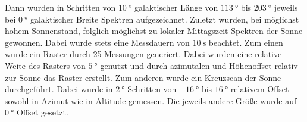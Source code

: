 Dann wurden in Schritten von $\SI{10}{\degree}$ galaktischer Länge von $\SI{113}{\degree}$ bis $\SI{203}{\degree}$ jeweils bei $\SI{0}{\degree}$ galaktischer Breite Spektren aufgezeichnet.
Zuletzt wurden, bei möglichst hohem Sonnenstand, folglich möglichst zu lokaler Mittagszeit Spektren der Sonne gewonnen.
Dabei wurde stets eine Messdauern von $\SI{10}{\second}$ beachtet.
Zum einen wurde ein Raster durch 25 Messungen generiert.
Dabei wurden eine relative Weite des Rasters von $\SI{5}{\degree}$ genutzt und durch azimutalen und Höhenoffset relativ zur Sonne das Raster erstellt.
Zum anderen wurde ein Kreuzscan der Sonne durchgeführt.
Dabei wurde in $\SI{2}{\degree}$-Schritten von $\SI{-16}{\degree}$ bis $\SI{16}{\degree}$ relativem Offset sowohl in Azimut wie in Altitude gemessen. Die jeweils andere Größe wurde auf $\SI{0}{\degree}$ Offset gesetzt.